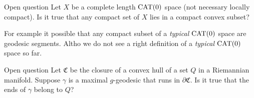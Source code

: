 \documentclass[a4paper,10pt]{article}
\begin{document}
\begin{thm}{Open question}
Let $X$ be a complete length $\operatorname{\rm CAT}(0)$ space (not necessary locally compact).
Is it true that any compact set of $X$ lies in a compact convex subset?
\end{thm}

For example it possible that any compact subset of a \emph{typical} $\operatorname{\rm CAT}(0)$ space are geodesic segments.
Altho we do not see a right definition of a \emph{typical} $\operatorname{\rm CAT}(0)$ space so far.

\begin{thm}{Open question}
Let $\mathfrak{C}$ be the closure of a convex hull of a set $Q$ in a Riemannian manifold.
Suppose $\gamma$ is a maximal $g$-geodesic that runs in $\partial \mathfrak{C}$.
Is it true that the ends of $\gamma$ belong to $Q$?
\end{thm}




\end{document}
